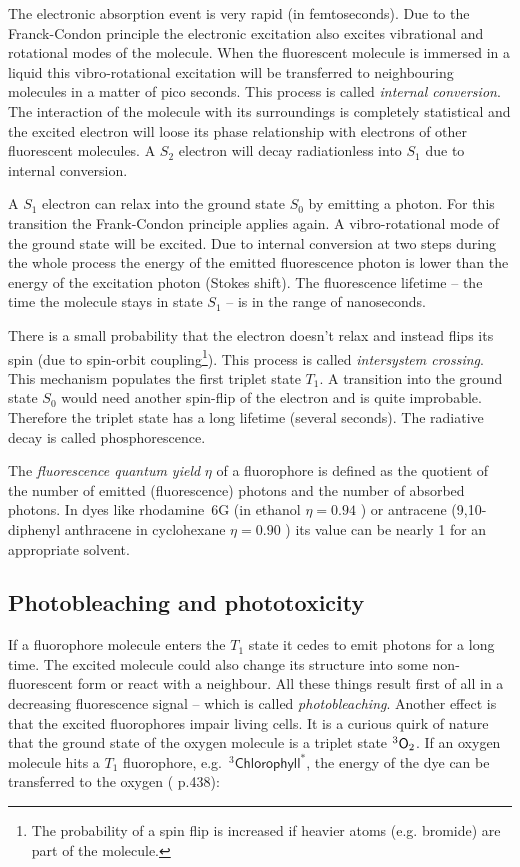 The electronic absorption event is very rapid (in femtoseconds). Due
to the Franck-Condon principle the electronic excitation also excites
vibrational and rotational modes of the molecule. When the fluorescent
molecule is immersed in a liquid this vibro-rotational excitation will
be transferred to neighbouring molecules in a matter of pico
seconds. This process is called \emph{internal conversion}. The
interaction of the molecule with its surroundings is completely
statistical and the excited electron will loose its phase relationship
with electrons of other fluorescent molecules. A $S_2$ electron will
decay radiationless into $S_1$ due to internal conversion.

A $S_1$ electron can relax into the ground state $S_0$ by emitting a
photon. For this transition the Frank-Condon principle applies
again. A vibro-rotational mode of the ground state will be excited.
Due to internal conversion at two steps during the whole process the
energy of the emitted fluorescence photon is lower than the energy of
the excitation photon (Stokes shift). The fluorescence lifetime -- the
time the molecule stays in state $S_1$ -- is in the range of
nanoseconds.

There is a small probability that the electron doesn't relax and
instead flips its spin (due to spin-orbit coupling\footnote{The
  probability of a spin flip is increased if heavier atoms
  (e.g. bromide) are part of the molecule.}). This process is called
\emph{intersystem crossing}. This mechanism populates the first
triplet state $T_1$. A transition into the ground state $S_0$ would
need another spin-flip of the electron and is quite
improbable. Therefore the triplet state has a long lifetime (several
seconds). The radiative decay is called phosphorescence.
  
The \emph{fluorescence quantum yield} $\eta$ of a fluorophore is
defined as the quotient of the number of emitted (fluorescence)
photons and the number of absorbed photons. In dyes like rhodamine~6G
(in ethanol $\eta=0.94$ \cite{Fischer1996}) or antracene
(9,10-diphenyl anthracene in cyclohexane $\eta=0.90$ \cite{Hamai1983})
its value can be nearly 1 for an appropriate solvent.

\subsection{Photobleaching and phototoxicity}
    
If a fluorophore molecule enters the $T_1$ state it cedes to emit
photons for a long time. The excited molecule could also change its
structure into some non-fluorescent form or react with a
neighbour. All these things result first of all in a decreasing
fluorescence signal -- which is called \emph{photobleaching}.  Another
effect is that the excited fluorophores impair living cells.  It is a
curious quirk of nature that the ground state of the oxygen molecule
is a triplet state ${}^3\textsf{O}_2$.  If an oxygen molecule hits a $T_1$
fluorophore, e.g.\ ${}^3\textsf{Chlorophyll}^*$, the energy of the dye
can be transferred to the oxygen (\cite{Haken2006} p.438):

